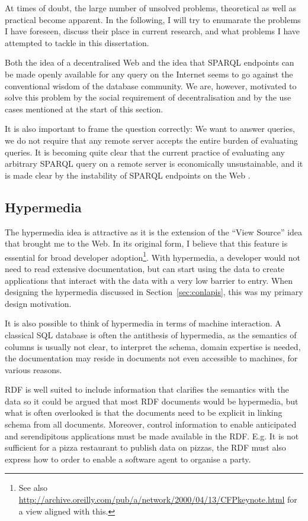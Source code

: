 At times of doubt, the large number of unsolved problems, theoretical
as well as practical become apparent. In the following, I will try to
enumarate the problems I have foreseen, discuss their place in current
research, and what problems I have attempted to tackle in this
dissertation.

Both the idea of a decentralised Web and the idea that SPARQL
endpoints can be made openly available for any query on the Internet
seems to go against the conventional wisdom of the database
community. We are, however, motivated to solve this problem by the
social requirement of decentralisation and by the use cases mentioned
at the start of this section.

It is also important to frame the question correctly: We want to
answer queries, we do not require that any remote server accepts the
entire burden of evaluating queries. It is becoming quite clear that
the current practice of evaluating any arbitrary SPARQL query on a
remote server is economically unsustainable, and it is made clear by
the instability of SPARQL endpoints on the Web \cite{buil2013sparql}.

\subsection{Hypermedia}

The hypermedia idea is attractive as it is the extension of the ``View
Source'' idea that brought me to the Web. In its original form, I
believe that this feature is essential for broad developer
adoption\footnote{See also
  \url{http://archive.oreilly.com/pub/a/network/2000/04/13/CFPkeynote.html}
  for a view aligned with this.}. With hypermedia, a developer would
not need to read extensive documentation, but can start using the data
to create applications that interact with the data with a very low
barrier to entry. When designing the hypermedia discussed in
Section~\ref{sec:conlapis}, this was my primary design motivation. 

It is also possible to think of hypermedia in terms of machine
interaction. A classical SQL database is often the antithesis of
hypermedia, as the semantics of columns is usually not clear, to
interpret the schema, domain expertise is needed, the documentation
may reside in documents not even accessible to machines, for various
reasons.

RDF is well suited to include information that clarifies the semantics
with the data so it could be argued that most RDF documents would be
hypermedia, but what is often overlooked is that the documents need to
be explicit in linking schema from all documents. Moreover, control
information to enable anticipated and serendipitous applications must
be made available in the RDF. E.g. It is not sufficient for a pizza
restaurant to publish data on pizzas, the RDF must also express how to
order to enable a software agent to organise a party.

